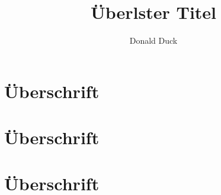 \documentclass[ngerman]{scrbook}
\begin{document}
\title{Überlster Titel}
\author{Donald Duck}
\maketitle
\tableofcontents
\part{Überschrift}
\Blinddocument
\blinddocument
\part{Überschrift}
\blinddocument
\blinddocument
\blinddocument
\blinddocument
\part{Überschrift}
\blinddocument
\blinddocument
\end{document}
